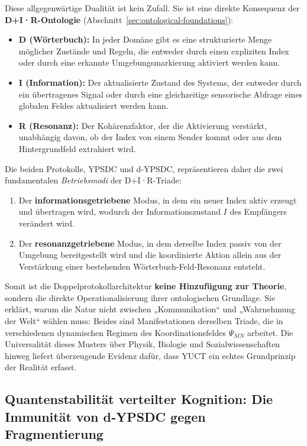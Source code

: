 \documentclass[11pt,a4paper]{article}
\begin{document}
	\medskip
	\noindent
	Diese allgegenwärtige Dualität ist kein Zufall. Sie ist eine direkte Konsequenz der
	\textbf{D+I·R-Ontologie} (Abschnitt~\ref{sec:ontological-foundations}):
	\begin{itemize}[leftmargin=*]
		\item \textbf{D (Wörterbuch):} In jeder Domäne gibt es eine strukturierte Menge möglicher Zustände und Regeln, die entweder durch einen expliziten Index oder durch eine erkannte Umgebungsmarkierung aktiviert werden kann.
		\item \textbf{I (Information):} Der aktualisierte Zustand des Systems, der entweder durch ein übertragenes Signal oder durch eine gleichzeitige sensorische Abfrage eines globalen Feldes aktualisiert werden kann.
		\item \textbf{R (Resonanz):} Der Kohärenzfaktor, der die Aktivierung verstärkt, unabhängig davon, ob der Index von einem Sender kommt oder aus dem Hintergrundfeld extrahiert wird.
	\end{itemize}
	
	Die beiden Protokolle, YPSDC und d‑YPSDC, repräsentieren daher die zwei fundamentalen \emph{Betriebsmodi} der D+I·R-Triade:
	\begin{enumerate}[leftmargin=*]
		\item Der \textbf{informationsgetriebene} Modus, in dem ein neuer Index aktiv erzeugt und übertragen wird, wodurch der Informationszustand \(I\) des Empfängers verändert wird.
		\item Der \textbf{resonanzgetriebene} Modus, in dem derselbe Index passiv von der Umgebung bereitgestellt wird und die koordinierte Aktion allein aus der Verstärkung einer bestehenden Wörterbuch-Feld-Resonanz entsteht.
	\end{enumerate}
	
	Somit ist die Doppelprotokollarchitektur \textbf{keine Hinzufügung zur Theorie}, sondern die direkte Operationalisierung ihrer ontologischen Grundlage. Sie erklärt, warum die Natur nicht zwischen „Kommunikation“ und „Wahrnehmung der Welt“ wählen muss: Beides sind Manifestationen derselben Triade, die in verschiedenen dynamischen Regimen des Koordinationsfeldes \(\Psi_{MN}\) arbeitet. Die Universalität dieses Musters über Physik, Biologie und Sozialwissenschaften hinweg liefert überzeugende Evidenz dafür, dass YUCT ein echtes Grundprinzip der Realität erfasst.
	
	\subsection{Quantenstabilität verteilter Kognition: Die Immunität von d‑YPSDC gegen Fragmentierung}
	\label{subsec:quantum-stability-cognition}
	
\end{document}
